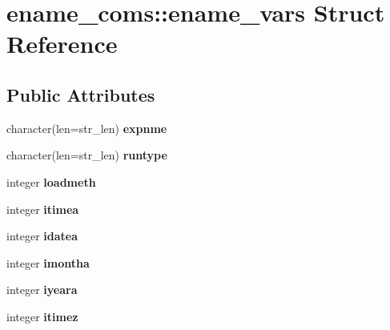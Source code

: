 \hypertarget{structename__coms_1_1ename__vars}{
\section{ename\_\-coms::ename\_\-vars Struct Reference}
\label{structename__coms_1_1ename__vars}
}
\subsection*{Public Attributes}
\begin{DoxyCompactItemize}
\item 
\hypertarget{structename__coms_1_1ename__vars_a970bc05935c2ee24f02591aa0ca5457a}{
character(len=str\_\-len) {\bfseries expnme}}
\label{structename__coms_1_1ename__vars_a970bc05935c2ee24f02591aa0ca5457a}

\item 
\hypertarget{structename__coms_1_1ename__vars_ac621d47b49d6ebf3a550bde26b79cb7a}{
character(len=str\_\-len) {\bfseries runtype}}
\label{structename__coms_1_1ename__vars_ac621d47b49d6ebf3a550bde26b79cb7a}

\item 
\hypertarget{structename__coms_1_1ename__vars_a5a627b7bee8641965c4634543124baee}{
integer {\bfseries loadmeth}}
\label{structename__coms_1_1ename__vars_a5a627b7bee8641965c4634543124baee}

\item 
\hypertarget{structename__coms_1_1ename__vars_ab6598af99bba785d39e12ec80258deb7}{
integer {\bfseries itimea}}
\label{structename__coms_1_1ename__vars_ab6598af99bba785d39e12ec80258deb7}

\item 
\hypertarget{structename__coms_1_1ename__vars_a5b5b94083eead564a2ee1c26d85d1f91}{
integer {\bfseries idatea}}
\label{structename__coms_1_1ename__vars_a5b5b94083eead564a2ee1c26d85d1f91}

\item 
\hypertarget{structename__coms_1_1ename__vars_ac6472e55ef8ab1e7120d3f8f0852e31b}{
integer {\bfseries imontha}}
\label{structename__coms_1_1ename__vars_ac6472e55ef8ab1e7120d3f8f0852e31b}

\item 
\hypertarget{structename__coms_1_1ename__vars_af845d0d3822083d1e7f6a177f0a0907a}{
integer {\bfseries iyeara}}
\label{structename__coms_1_1ename__vars_af845d0d3822083d1e7f6a177f0a0907a}

\item 
\hypertarget{structename__coms_1_1ename__vars_a573c1b058bf40a8e399099048da26899}{
integer {\bfseries itimez}}
\label{structename__coms_1_1ename__vars_a573c1b058bf40a8e399099048da26899}


\end{DoxyCompactItemize}
